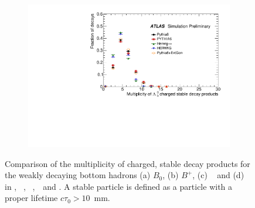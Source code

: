 \begin{figure}
\begin{subfigure}[]{0.45\textwidth}
\end{subfigure}
\begin{subfigure}[]{0.45\textwidth}
\includegraphics[width=\textwidth]{evtgen/figures/EvtGen/Lambdab0/h_species_ncharge.pdf}
\end{subfigure}
\caption{Comparison of the multiplicity of charged, stable decay products for the weakly decaying bottom hadrons 
(a) $B_0$, (b) $B^{+}$, (c) \Bs~ and (d) \Lb~
in \PythiaE,~ \Pythia,~ \Herwigpp,~\Herwig\ and \EvtGen. A stable particle is defined
as a particle with a proper lifetime $c\tau_{0}>10$~mm. }
\label{fig:bcharge}
\end{figure}

